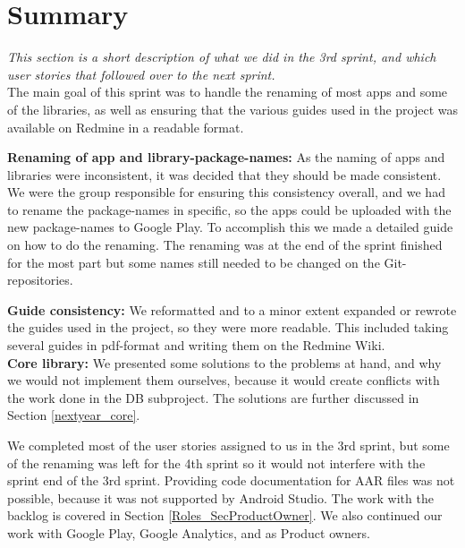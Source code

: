 \section{Summary}
\textit{This section is a short description of what we did in the 3rd sprint, and which user stories that followed over to the next sprint.}\\

The main goal of this sprint was to handle the renaming of most apps and some of the libraries, as well as ensuring that the various guides used in the project was available on Redmine in a readable format.

\textbf{Renaming of app and library-package-names:}
As the naming of apps and libraries were inconsistent, it was decided that they should be made consistent. We were the group responsible for ensuring this consistency overall, and we had to rename the package-names in specific, so the apps could be uploaded with the new package-names to Google Play. To accomplish this we made a detailed guide on how to do the renaming. The renaming was at the end of the sprint finished for the most part but some names still needed to be changed on the Git-repositories.

\textbf{Guide consistency:}
We reformatted and to a minor extent expanded or rewrote the guides used in the project, so they were more readable. This included taking several guides in pdf-format and writing them on the Redmine Wiki.\\

\textbf{Core library:}
We presented some solutions to the problems at hand, and why we would not implement them ourselves, because it would create conflicts with the work done in the DB subproject. The solutions are further discussed in Section \ref{nextyear_core}.

We completed most of the user stories assigned to us in the 3rd sprint, but some of the renaming was left for the 4th sprint so it would not interfere with the sprint end of the 3rd sprint. Providing code documentation for AAR files was not possible, because it was not supported by Android Studio. The work with the backlog is covered in Section \ref{Roles_SecProductOwner}. We also continued our work with Google Play, Google Analytics, and as Product owners.
